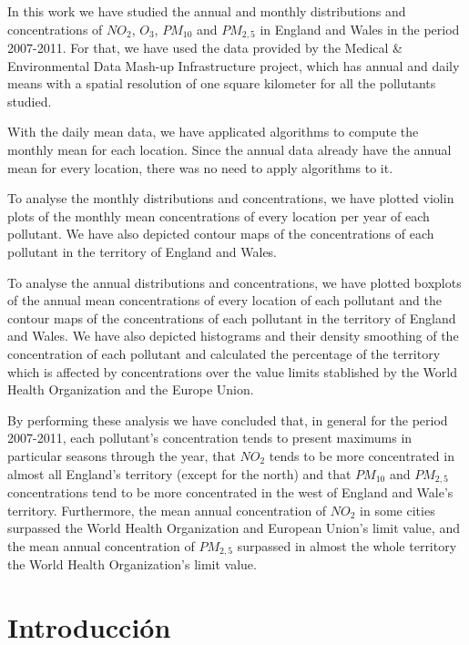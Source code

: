 \documentclass[12pt]{article}
\begin{document}
In this work we have studied the annual and monthly distributions and concentrations of $NO_{2}$, $O_{3}$, $PM_{10}$ and $PM_{2,5}$ in England and Wales in the period 2007-2011. For that, we have used the data provided by the Medical \& Environmental Data Mash-up Infrastructure project, which has annual and daily means with a spatial resolution of one square kilometer for all the pollutants studied.

With the daily mean data, we have applicated algorithms to compute the monthly mean for each location. Since the annual data already have the annual mean for every location, there was no need to apply algorithms to it.

To analyse the monthly distributions and concentrations, we have plotted violin plots of the monthly mean concentrations of every location per year of each pollutant. We have also depicted contour maps of the concentrations of each pollutant in the territory of England and Wales.

To analyse the annual distributions and concentrations, we have plotted boxplots of the annual mean concentrations of every location of each pollutant and the contour maps of the concentrations of each pollutant in the territory of England and Wales. We have also depicted histograms and their density smoothing of the concentration of each pollutant and calculated the percentage of the territory which is affected by concentrations over the value limits stablished by the World Health Organization and the Europe Union.

By performing these analysis we have concluded that, in general for the period 2007-2011, each pollutant's concentration tends to present maximums in particular seasons through the year, that $NO_{2}$ tends to be more concentrated in almost all England's territory (except for the north) and that $PM_{10}$ and $PM_{2,5}$ concentrations tend to be more concentrated in the west of England and Wale's territory. Furthermore, the mean annual concentration of $NO_{2}$ in some cities surpassed the World Health Organization and European Union's limit value, and the mean annual concentration of $PM_{2,5}$ surpassed in almost the whole territory the World Health Organization's limit value.

\newpage


\section{Introducción}
\end{document}
